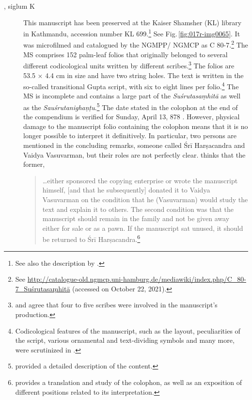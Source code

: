 \begin{description}
    
    \item[, siglum K] This manuscript has been preserved
at the Kaiser Shamsher (KL) library in Kathmandu, accession number KL
699.\footnote{See also the description by \citet[\S 2.1]{kleb-2021b}.} See
    Fig.\,\ref{fig:017r-img0065}. It was microfilmed and catalogued by the
    NGMPP/ NGMCP as C 80-7.\footnote{See
        \url{http://catalogue-old.ngmcp.uni-hamburg.de/mediawiki/index.php/C_80-7_Suśrutasaṃhitā}
         (accessed on October 22, 2021).} The MS comprises 152 palm-leaf folios that 
        originally belonged to several different codicological units written by different 
        scribes.\footnote{ \textcites[46]{bhat-2020} and \textcites[11]{kleb-2021b} agree 
        that four to five scribes were involved in the manuscript's production.} The folios 
        are 53.5 $\times$ 4.4 cm in size and have two string holes.  The text is written in 
        the so-called transitional Gupta script, with six to eight lines per 
        folio.\footnote{Codicological features of the manuscript, such as the layout, 
        peculiarities of the script, various ornamental and text-dividing symbols and many 
        more, were scrutinized in \textcites{bhat-2020}.} The MS is incomplete and 
        contains a large part of the \emph{Suśrutasaṃhitā} as well as the 
        \emph{Sauśrutanighaṇṭu}.\footnote{\textcite[11]{kleb-2021b} provided a detailed 
        description of the content.} The date stated in the colophon at the end of the 
        compendium is verified for Sunday, April 13, 878 \CE. However, physical damage 
        to the manuscript folio containing the colophon means that it is no longer possible 
        to interpret it definitively.  In particular, two persons are mentioned in the 
        concluding remarks, someone called Śrī Harṣacandra and Vaidya Vasuvarman, but 
        their roles are not perfectly clear. \textcites[16]{kleb-2021b} thinks that the 
        former,
    \begin{quote}
        \ldots either sponsored the copying enterprise or wrote the manuscript himself,
        [and that he subsequently] donated it to Vaidya Vasuvarman on the condition that
        he (Vasuvarman) would study the text and explain it to others. The second
        condition was that the manuscript should remain in the family and not be given
        away either for sale or as a pawn. If the manuscript sat unused, it should be
        returned to Śrī Harṣacandra.\footnote{\textcite[13--17]{kleb-2021b} provides a
        translation and study of the colophon, as well as an exposition of different
        positions related to its interpretation.}
    \end{quote}
    

\end{description}
